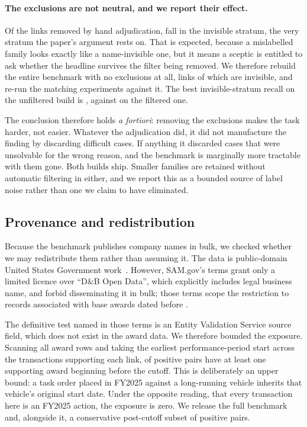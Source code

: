 \paragraph{The exclusions are not neutral, and we report their effect.} Of the links
removed by hand adjudication, \BenchDropInvisiblePct fall in the invisible stratum,
the very stratum the paper's argument rests on. That is expected, because a mislabelled
family looks exactly like a name-invisible one, but it means a sceptic is entitled to ask
whether the headline survives the filter being removed. We therefore rebuild the entire
benchmark with no exclusions at all, \SensUnfilteredLinks links of which
\SensUnfilteredInvisible are invisible, and re-run the matching experiments against
it. The best invisible-stratum recall on the unfiltered build is
\SensUnfilteredInvisibleRecall, against \SensFilteredInvisibleRecall on the filtered one.

The conclusion therefore holds \emph{a fortiori}: removing the exclusions makes the task
harder, not easier. Whatever the adjudication did, it did not manufacture the finding by
discarding difficult cases. If anything it discarded cases that were unsolvable for
the wrong reason, and the benchmark is marginally more tractable with them gone. Both
builds ship. Smaller families are retained without automatic filtering in either, and we
report this as a bounded source of label noise rather than one we claim to have
eliminated.

\subsection{Provenance and redistribution}
\label{sec:provenance}

Because the benchmark publishes company names in bulk, we checked whether we may
redistribute them rather than assuming it. The data is public-domain United States
Government work~\citep{usaspending_api}. However, SAM.gov's terms grant only a limited
licence over ``D\&B Open Data'', which explicitly includes legal business name, and forbid
disseminating it in bulk; those terms scope the restriction to records associated with
base awards dated before \DnbCutoff.

The definitive test named in those terms is an Entity Validation Service source field,
which does not exist in the award data. We therefore bounded the exposure. Scanning all
\DnbLinksScanned award rows and taking the earliest performance-period start across the
transactions supporting each link, \DnbPctPre of positive pairs have at least one
supporting award beginning before the cutoff. This is deliberately an upper bound: a task
order placed in FY2025 against a long-running vehicle inherits that vehicle's original
start date. Under the opposite reading, that every transaction here is an FY2025 action,
the exposure is zero. We release the full benchmark and, alongside it, a conservative
post-cutoff subset of \DnbConservativePos positive pairs.

